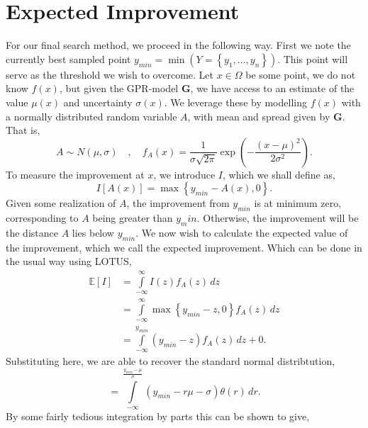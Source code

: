 %
%
%
%


%
\chapter{Expected Improvement}
For our final search method, we proceed in the following way. First we note the currently best sampled point $y_{min} = \min \left( Y = \left\{ y_1, \ldots , y_n \right\}  \right) $. This point will serve as the threshold we wish to overcome.
Let $x \in \Omega$ be some point, we do not know $f\left( x \right) $, but given the GPR-model $\bm{G}$, we have access to an estimate of the value $\mu \left( x \right) $ and uncertainty $\sigma\left( x \right) $. We leverage these by modelling $f\left( x \right) $ with a normally distributed random variable $A$, with mean and spread given by $\bm{G}$. That is,
 \[
A \sim N\left( \mu, \sigma \right) \quad, \quad f_A\left( x \right) = \frac{1}{\sigma \sqrt{2\pi} }\exp\left( - \frac{\left( x - \mu  \right) ^2}{2\sigma^2} \right) 
.\]
To measure the improvement at $x$, we introduce $I$, which we shall define as,
\[
    I\left[ A\left( x \right) \right] = \max\left\{ y_{min} - A\left( x \right) , 0 \right\}
.\]
Given some realization of $A$, the improvement from $y_{min}$ is at minimum zero, corresponding to $A$ being greater than $y_min$. Otherwise, the improvement will be the distance $A$ lies below $y_{min}$. We now wish to calculate the expected value of the improvement, which we call the expected improvement. Which can be done in the usual way using LOTUS,
\begin{align*}
\mathbb{E}\left[ I \right]  &= \int\limits_{-\infty}^{\infty} I\left( z \right) f_A\left( z \right) \, dz \\
&= \int\limits_{-\infty}^{\infty}  \max\left\{ y_{min} - z, 0 \right\} f_A\left( z \right) \, dz\\
&= \int\limits_{-\infty}^{y_{min}} \left( y_{min}-z \right) f_A\left( z \right)\, dz + 0
.\end{align*}
Substituting here, we are able to recover the standard normal distribtution,
\[
 =   \int\limits_{-\infty}^{\frac{y_{min} - \mu }{\sigma}}\left( y_{min} - r\mu - \sigma \right) \theta \left( r \right) \, dr
.\] 
By some fairly tedious integration by parts this can be shown to give,
